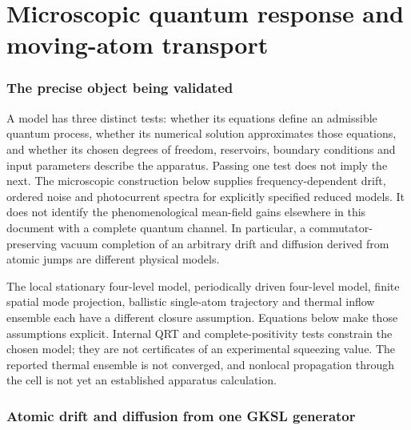 \part{Microscopic quantum response and moving-atom transport}
\label{part:gc-microscopic}

\section{The precise object being validated}
\label{sec:gc-contract}

A model has three distinct tests: whether its equations define an admissible
quantum process, whether its numerical solution approximates those equations,
and whether its chosen degrees of freedom, reservoirs, boundary conditions and
input parameters describe the apparatus. Passing one test does not imply the
next. The microscopic construction below supplies frequency-dependent drift,
ordered noise and photocurrent spectra for explicitly specified reduced models.
It does not identify the phenomenological mean-field gains elsewhere in this
document with a complete quantum channel. In particular, a commutator-preserving
vacuum completion of an arbitrary drift and diffusion derived from atomic jumps
are different physical models.

The local stationary four-level model, periodically driven four-level model,
finite spatial mode projection, ballistic single-atom trajectory and thermal
inflow ensemble each have a different closure assumption. Equations below make
those assumptions explicit. Internal QRT and complete-positivity tests constrain
the chosen model; they are not certificates of an experimental squeezing value.
The reported thermal ensemble is not converged, and nonlocal propagation through
the cell is not yet an established apparatus calculation.

\section{Atomic drift and diffusion from one GKSL generator}
\label{sec:gc-atomic}

